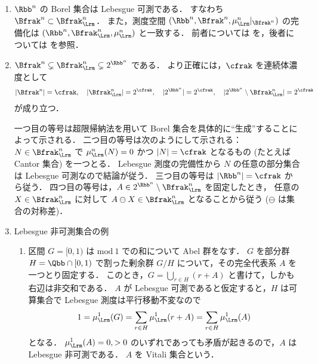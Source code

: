 \begin{remark}\label{rem:Borel_Lebesgue}
    \leavevmode
    \begin{enumerate}
        \item
            $\Rbb^n$ の Borel 集合は Lebesgue 可測である．
            すなわち $\Bfrak^n\subset\Bfrak_\Lrm^n$．
            また，測度空間 $(\Rbb^n,\Bfrak^n,\mu_\Lrm^n\vert_{\Bfrak^n})$ の完備化は
            $(\Rbb^n,\Bfrak_\Lrm^n,\mu_\Lrm^n)$ と一致する．
            前者については \cite[定理 7.2]{It63} を，後者については \cite[p.49]{It63} を参照．

        \item
            $\Bfrak^n\subsetneq\Bfrak_\Lrm^n\subsetneq2^{\Rbb^n}$ である．
            より正確には，$\cfrak$ を連続体濃度として
            \begin{align}
                |\Bfrak^n|=\cfrak,\quad
                |\Bfrak_\Lrm^n|=2^\cfrak,\quad
                |2^{\Rbb^n}|=2^\cfrak,\quad
                |2^{\Rbb^n}\setminus\Bfrak_\Lrm^n|=2^\cfrak
            \end{align}
            が成り立つ．

            一つ目の等号は超限帰納法を用いて Borel 集合を具体的に``生成''することによって示される\cite{ms70880}．
            二つ目の等号は次のようにして示される：
            $N\in\Bfrak_\Lrm^n$ で $\mu_\Lrm^n(N)=0$ かつ $|N|=\cfrak$ となるもの (たとえば Cantor 集合) を一つとる．
            Lebesgue 測度の完備性から $N$ の任意の部分集合は Lebesgue 可測なので結論が従う．
            三つ目の等号は $|\Rbb^n|=\cfrak$ から従う．
            四つ目の等号は，$A\in2^{\Rbb^n}\setminus\Bfrak_\Lrm^n$ を固定したとき，
            任意の $X\in\Bfrak_\Lrm^n$ に対して $A\ominus X\in\Bfrak_\Lrm^n$ となることから従う ($\ominus$ は集合の対称差)．

        \item Lebesgue 非可測集合の例
            \begin{enumerate}
                \item
                    区間 $G=[0,1)$ は $\mathrm{mod}\ 1$ での和について Abel 群をなす．
                    $G$ を部分群 $H=\Qbb\cap[0,1)$ で割った剰余群 $G/H$ について，その完全代表系 $A$ を一つとり固定する．
                    このとき，$G=\bigcup_{r\in H}(r+A)$ と書けて，しかも右辺は非交和である．
                    $A$ が Lebesgue 可測であると仮定すると，$H$ は可算集合で Lebesgue 測度は平行移動不変なので
                    \begin{align*}
                        1
                        =\mu_\Lrm^1(G)
                        =\sum_{r\in H}\mu_\Lrm^1(r+A)
                        =\sum_{r\in H}\mu_\Lrm^1(A)
                    \end{align*}
                    となる．
                    $\mu_\Lrm^1(A)=0,>0$ のいずれであっても矛盾が起きるので，$A$ は Lebesgue 非可測である．
                    $A$ を Vitali 集合という．


\end{enumerate}
\end{enumerate}
\end{remark}
